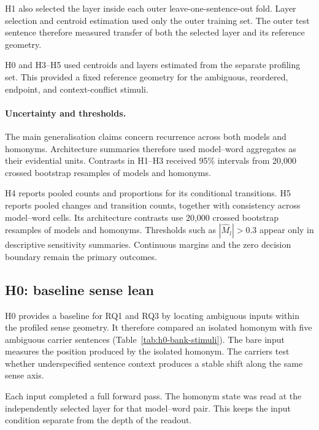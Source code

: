 \documentclass[conference]{IEEEtran}
\begin{document}
H1 also selected the layer inside each outer leave-one-sentence-out fold.
Layer selection and centroid estimation used only the outer training set. The
outer test sentence therefore measured transfer of both the selected layer and
its reference geometry.

H0 and H3--H5 used centroids and layers estimated from the separate profiling
set. This provided a fixed reference geometry for the ambiguous, reordered,
endpoint, and context-conflict stimuli.

\paragraph{Uncertainty and thresholds.}
The main generalisation claims concern recurrence across both models and
homonyms. Architecture summaries therefore used model--word aggregates as
their evidential units. Contrasts in H1--H3 received 95\% intervals from
20,000 crossed bootstrap resamples of models and homonyms.

H4 reports pooled counts and proportions for its conditional transitions.
H5 reports pooled changes and transition counts, together with consistency
across model--word cells. Its architecture contrasts use 20,000 crossed
bootstrap resamples of models and homonyms. Thresholds such as
$|\widehat{M}_l|>0.3$ appear only in descriptive sensitivity summaries.
Continuous margins and the zero decision boundary remain the primary outcomes.

\subsection{H0: baseline sense lean}
\label{sec:h0}

H0 provides a baseline for RQ1 and RQ3 by locating ambiguous inputs within the
profiled sense geometry. It therefore compared an isolated homonym with five
ambiguous carrier sentences (Table~\ref{tab:h0-bank-stimuli}). The bare input measures
the position produced by the isolated homonym. The carriers test whether
underspecified sentence context produces a stable shift along the same sense
axis.

Each input completed a full forward pass. The homonym state was read at the
independently selected layer for that model--word pair. This keeps the input
condition separate from the depth of the readout.
\end{document}
